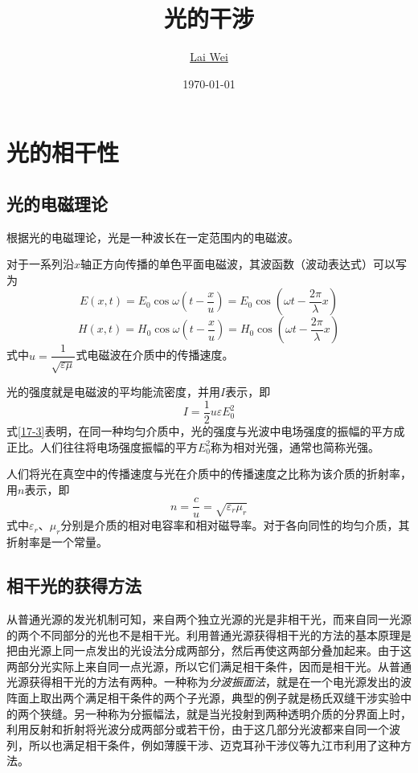 \documentclass[12pt]{article}
\title{光的干涉}
\author{\href{mailto:lai-wei@whu.edu.cn}{Lai Wei}}
\date{\today}
\begin{document}
\maketitle

\section{光的相干性}

\subsection{光的电磁理论}

根据光的电磁理论，光是一种波长在一定范围内的电磁波。

对于一系列沿\(x\)轴正方向传播的单色平面电磁波，其波函数（波动表达式）可以写为
\begin{equation}
E(x, t)=E_0 \cos \omega\left(t-\frac{x}{u}\right)=E_0 \cos \left(\omega t-\frac{2 \pi}{\lambda} x\right)
\end{equation}
\begin{equation}
H(x, t)=H_0 \cos \omega\left(t-\frac{x}{u}\right)=H_0 \cos \left(\omega t-\frac{2 \pi}{\lambda} x\right)
\end{equation}
式中\(u = \dfrac{1}{\sqrt{\varepsilon \mu}}\)式电磁波在介质中的传播速度。

光的强度就是电磁波的平均能流密度，并用\(I\)表示，即
\begin{equation}
I=\frac{1}{2} u \varepsilon E_0^2
\label{17-3}
\end{equation}
式\ref{17-3}表明，在同一种均匀介质中，光的强度与光波中电场强度的振幅的平方成正比。人们往往将电场强度振幅的平方\(E_0^2\)称为相对光强，通常也简称光强。

人们将光在真空中的传播速度与光在介质中的传播速度之比称为该介质的折射率，用\(n\)表示，即
\begin{equation}
    n = \frac{c}{u} = \sqrt{\varepsilon_r \mu_r}
\end{equation}
式中\(\varepsilon_r\)、\(\mu_r\)分别是介质的相对电容率和相对磁导率。对于各向同性的均匀介质，其折射率是一个常量。

\subsection{相干光的获得方法}

从普通光源的发光机制可知，来自两个独立光源的光是非相干光，而来自同一光源的两个不同部分的光也不是相干光。利用普通光源获得相干光的方法的基本原理是把由光源上同一点发出的光设法分成两部分，然后再使这两部分叠加起来。由于这两部分光实际上来自同一点光源，所以它们满足相干条件，因而是相干光。从普通光源获得相干光的方法有两种。一种称为\emph{分波振面法}，就是在一个电光源发出的波阵面上取出两个满足相干条件的两个子光源，典型的例子就是杨氏双缝干涉实验中的两个狭缝。另一种称为分振幅法，就是当光投射到两种透明介质的分界面上时，利用反射和折射将光波分成两部分或若干份，由于这几部分光波都来自同一个波列，所以也满足相干条件，例如薄膜干涉、迈克耳孙干涉仪等九江市利用了这种方法。
\end{document}
